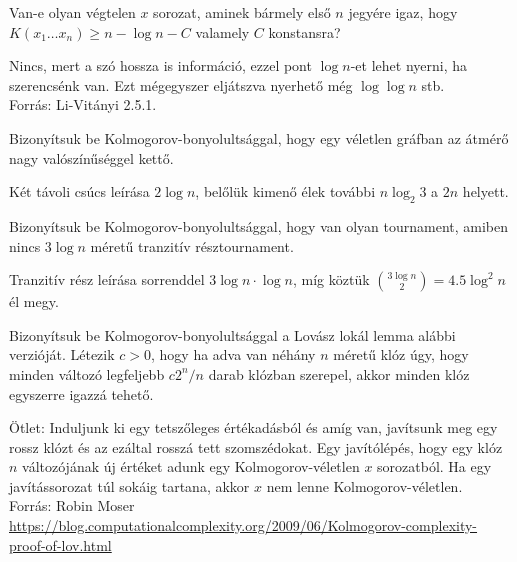 \begin{Exercise}[counter={sorszam}, difficulty=1]
	Van-e olyan v\'egtelen $x$ sorozat, aminek b\'armely els\H o $n$ jegy\'ere igaz, hogy $K(x_1\ldots x_n)\ge n-\log n - C$ valamely $C$ konstansra?
\end{Exercise}	
\begin{Answer}
	Nincs, mert a sz\'o hossza is inform\'aci\'o, ezzel pont $\log n$-et lehet nyerni, ha szerencs\'enk van. Ezt m\'egegyszer elj\'atszva nyerhet\H o m\'eg $\log\log n$ stb.\\
	Forr\'as: Li-Vit\'anyi 2.5.1.
\end{Answer}

\begin{Exercise}[counter={sorszam}, difficulty=0]
	Bizony\'itsuk be Kolmogorov-bonyolults\'aggal, hogy egy v\'eletlen gr\'afban az \'atm\'er\H o nagy val\'osz\'in\H us\'eggel kett\H o.
\end{Exercise}	
\begin{Answer}
	K\'et t\'avoli cs\'ucs le\'ir\'asa $2\log n$, bel\H ol\"uk kimen\H o \'elek tov\'abbi $n \log_2 3$ a $2n$ helyett.
\end{Answer}

\begin{Exercise}[counter={sorszam}, difficulty=0]
	Bizony\'itsuk be Kolmogorov-bonyolults\'aggal, hogy van olyan tournament, amiben nincs $3 \log n$ m\'eret\H u tranzit\'iv r\'esztournament.
\end{Exercise}	
\begin{Answer}
	Tranzit\'iv r\'esz le\'ir\'asa sorrenddel $3\log n \cdot \log n$, m\'ig k\"ozt\"uk $\binom{3 \log n}2=4.5\log^2 n$ \'el megy.
\end{Answer}

\begin{Exercise}[counter={sorszam}, difficulty=1]
	Bizony\'itsuk be Kolmogorov-bonyolults\'aggal a Lov\'asz lok\'al lemma al\'abbi verzi\'oj\'at. L\'etezik $c>0$, hogy ha adva van n\'eh\'any $n$ m\'eret\H u kl\'oz \'ugy, hogy minden v\'altoz\'o legfeljebb $c2^n/n$ darab kl\'ozban szerepel, akkor minden kl\'oz egyszerre igazz\'a tehet\H o.
\end{Exercise}	
\begin{Answer}
	\"Otlet: Induljunk ki egy tetsz\H oleges \'ert\'ekad\'asb\'ol \'es am\'ig van, jav\'itsunk meg egy rossz kl\'ozt \'es az ez\'altal
	rossz\'a tett szomsz\'edokat. Egy jav\'it\'ol\'ep\'es, hogy egy kl\'oz $n$ v\'altoz\'oj\'anak \'uj \'ert\'eket adunk egy Kolmogorov-v\'eletlen $x$ sorozatb\'ol. Ha egy jav\'it\'assorozat t\'ul sok\'aig tartana, akkor $x$ nem lenne Kolmogorov-v\'eletlen.\\
	Forr\'as: Robin Moser \url{https://blog.computationalcomplexity.org/2009/06/Kolmogorov-complexity-proof-of-lov.html}
\end{Answer}





